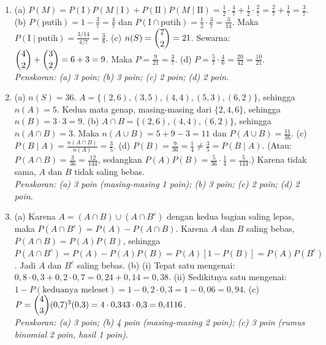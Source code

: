 \documentclass[a4paper,11pt]{article}
\newcommand{\dis}{\displaystyle}
\newcounter{no}
\begin{document}
\small\begin{enumerate}[leftmargin=2em,itemsep=3pt,topsep=2pt]
\item[\textbf{1.}] (a) $P(M)=P(\text{I})P(M\mid\text{I})+P(\text{II})P(M\mid\text{II})=\dis\frac12\cdot\dis\frac47+\dis\frac12\cdot\dis\frac27=\dis\frac27+\dis\frac17=\dis\frac37$. (b) $P(\text{putih})=1-\dis\frac37=\dis\frac47$ dan $P(\text{I}\cap\text{putih})=\dis\frac12\cdot\dis\frac37=\dis\frac3{14}$. Maka $P(\text{I}\mid\text{putih})=\dis\frac{3/14}{4/7}=\dis\frac38$. (c) $n(S)=\dbinom72=21$. Sewarna: $\dbinom42+\dbinom32=6+3=9$. Maka $P=\dis\frac9{21}=\dis\frac37$. (d) $P=\dis\frac57\cdot\dis\frac46=\dis\frac{20}{42}=\dis\frac{10}{21}$. \\ \textit{Penskoran: (a) 3 poin; (b) 3 poin; (c) 2 poin; (d) 2 poin.}
\item[\textbf{2.}] (a) $n(S)=36$. $A=\{(2,6),(3,5),(4,4),(5,3),(6,2)\}$, sehingga $n(A)=5$. Kedua mata genap, masing-masing dari $\{2,4,6\}$, sehingga $n(B)=3\cdot3=9$. (b) $A\cap B=\{(2,6),(4,4),(6,2)\}$, sehingga $n(A\cap B)=3$. Maka $n(A\cup B)=5+9-3=11$ dan $P(A\cup B)=\dis\frac{11}{36}$. (c) $P(B\mid A)=\dis\frac{n(A\cap B)}{n(A)}=\dis\frac35$. (d) $P(B)=\dis\frac9{36}=\dis\frac14\neq\dis\frac35=P(B\mid A)$. (Atau: $P(A\cap B)=\dis\frac3{36}=\dis\frac{12}{144}$, sedangkan $P(A)P(B)=\dis\frac5{36}\cdot\dis\frac14=\dis\frac5{144}$.) Karena tidak sama, $A$ dan $B$ tidak saling bebas. \\ \textit{Penskoran: (a) 3 poin (masing-masing 1 poin); (b) 3 poin; (c) 2 poin; (d) 2 poin.}
\item[\textbf{3.}] (a) Karena $A=(A\cap B)\cup(A\cap B^{c})$ dengan kedua bagian saling lepas, maka $P(A\cap B^{c})=P(A)-P(A\cap B)$. Karena $A$ dan $B$ saling bebas, $P(A\cap B)=P(A)P(B)$, sehingga $P(A\cap B^{c})=P(A)-P(A)P(B)=P(A)\left[1-P(B)\right]=P(A)P(B^{c})$. Jadi $A$ dan $B^{c}$ saling bebas. (b) (i) Tepat satu mengenai: $0{,}8\cdot0{,}3+0{,}2\cdot0{,}7=0{,}24+0{,}14=0{,}38$. (ii) Sedikitnya satu mengenai: $1-P(\text{keduanya meleset})=1-0{,}2\cdot0{,}3=1-0{,}06=0{,}94$. (c) $P=\dbinom43(0{,}7)^{3}(0{,}3)=4\cdot0{,}343\cdot0{,}3=0{,}4116$. \\ \textit{Penskoran: (a) 3 poin; (b) 4 poin (masing-masing 2 poin); (c) 3 poin (rumus binomial 2 poin, hasil 1 poin).}
\end{enumerate}
\end{document}
